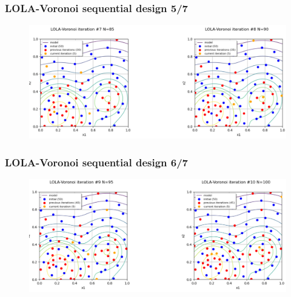 \documentclass[aspectratio=169]{beamer}
\begin{document}
\begin{frame}
\frametitle{LOLA-Voronoi sequential design 5/7}

\begin{figure}
   \includegraphics[width=1.04\textwidth]{figures/lolavoronoi_4}
\end{figure}

\end{frame}



\begin{frame}
\frametitle{LOLA-Voronoi sequential design 6/7}

\begin{figure}
   \includegraphics[width=1.04\textwidth]{figures/lolavoronoi_5}
\end{figure}

\end{frame}

\end{document}
